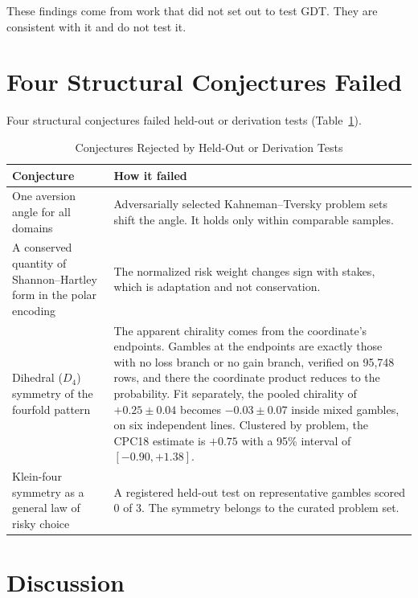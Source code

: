 \documentclass[journal]{IEEEtran}
\begin{document}
These findings come from work that did not set out to test GDT.
They are consistent with it and do not test it.

\section{Four Structural Conjectures Failed}
\label{sec:rejected}

Four structural conjectures failed held-out or derivation tests (Table~\ref{tab:rejected}).

\begin{table}[!t]
\renewcommand{\arraystretch}{1.2}
\caption{Conjectures Rejected by Held-Out or Derivation Tests}
\label{tab:rejected}
\centering
\begin{tabular}{@{}p{} p{}@{}}
\toprule
\textbf{Conjecture} & \textbf{How it failed} \\
\midrule
One aversion angle for all domains & Adversarially selected Kahneman--Tversky problem sets shift the angle. It holds only within comparable samples. \\
A conserved quantity of Shannon--Hartley form in the polar encoding & The normalized risk weight changes sign with stakes, which is adaptation and not conservation. \\
Dihedral ($D_4$) symmetry of the fourfold pattern & The apparent chirality comes from the coordinate's endpoints. Gambles at the endpoints are exactly those with no loss branch or no gain branch, verified on 95{,}748 rows, and there the coordinate product reduces to the probability. Fit separately, the pooled chirality of $+0.25\pm0.04$ becomes $-0.03\pm0.07$ inside mixed gambles, on six independent lines. Clustered by problem, the CPC18 estimate is $+0.75$ with a 95\% interval of $[-0.90, +1.38]$. \\
Klein-four symmetry as a general law of risky choice & A registered held-out test on representative gambles scored 0 of 3. The symmetry belongs to the curated problem set. \\
\bottomrule
\end{tabular}
\end{table}

\section{Discussion}
\label{sec:discussion}
\end{document}
